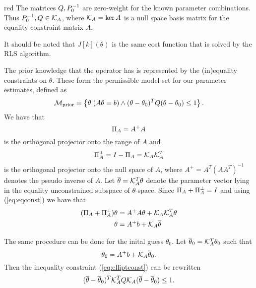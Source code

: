 \begin{assumption}

\begin{color}{red}
    The matrices $Q, P_0^{-1}$ are zero-weight for the known parameter combinations. Thus $P_0^{-1}, Q \in \mathcal{K}_A$, where
    $\mathcal{K}_A = \ker A$ is a null space basis matrix for the equality constraint matrix $A$.
\end{color}
\label{ass:NA_ass}
\end{assumption}
It should be noted that 
$J[k](\theta)$ is the same cost function that is solved
by the RLS algorithm. \cite{islam_recursive_2019}

The prior knowledge that the operator has is represented by the (in)equality constraints
on $\theta$. These form the permissible model set for our parameter estimates, defined as
\begin{equation}
    \mathcal{M}_{\text{prior}} = \left\{ \theta
    \vert
    (A\theta=b) \wedge (\theta-\theta_0)^TQ(\theta-\theta_0) \leq 1 \right\}.
\end{equation}
We have that
\begin{equation}
    \Pi_A = A^+A
\end{equation}
is the orthogonal projector onto the range of $A$ and
\begin{equation}
    \Pi_A^\perp = I - \Pi_A = \mathcal{K}_A\mathcal{K}_A^T
\end{equation}
is the orthogonal projector onto the null space of $A$,
where $A^+ = A^T(AA^T)^{-1}$ denotes the pseudo inverse of $A$.
Let $\overline{\theta} = \mathcal{K}_A^T\theta$ denote the parameter vector lying in the
equality unconstrained subspace of $\theta$-space. Since
$\Pi_A + \Pi_A^\perp = I$ and using (\ref{eq:eqconst}) we have that
\begin{align}
    (\Pi_A + \Pi_A^\perp)\theta &= A^+A\theta + \mathcal{K}_A\mathcal{K}_A^T\theta \notag \\
    \theta &= A^+b + \mathcal{K}_A\overline{\theta}
    \label{eq:thetanull}
\end{align}

The same procedure can be done for the inital guess $\theta_0$.
Let $\overline{\theta}_0 = \mathcal{K}_A^T\theta_0$ such that
\begin{equation}
    \theta_0 = A^+b + \mathcal{K}_A\overline{\theta}_0.
\end{equation}
Then the inequality constraint (\ref{eq:elliptconst}) can be rewritten
\begin{equation}
    (\overline{\theta}-\overline{\theta}_0)^T\mathcal{K}_A^TQ\mathcal{K}_A(\overline{\theta}-\overline{\theta}_0) \leq 1.
\end{equation}

